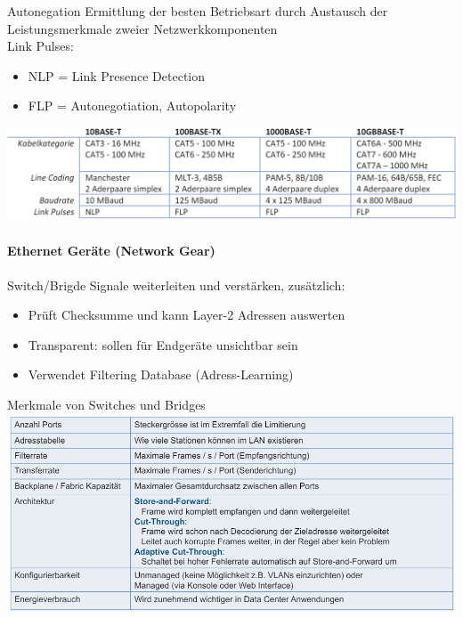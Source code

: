 \begin{concept}{Autonegation}
    Ermittlung der besten Betriebsart durch Austausch der Leistungsmerkmale zweier Netzwerkkomponenten\\
    Link Pulses:
    \begin{itemize}
        \item NLP = Link Presence Detection
        \item FLP = Autonegotiation, Autopolarity
    \end{itemize}
        \includegraphics[width=1\linewidth]{images/ethernet_systeme.png}
\end{concept}


\paragraph{Ethernet Geräte (Network Gear)}

\begin{definition}{Switch/Brigde} Signale weiterleiten und verstärken, zusätzlich:
    \begin{itemize}
        \item Prüft Checksumme und kann Layer-2 Adressen auswerten
        \item Transparent: sollen für Endgeräte unsichtbar sein
        \item Verwendet Filtering Database (Adress-Learning)
    \end{itemize}
\end{definition}

\begin{theorem}{Merkmale von Switches und Bridges}\\
    \includegraphics[width=1\linewidth]{images/merkmale_switches_bridges.png}
\end{theorem}


